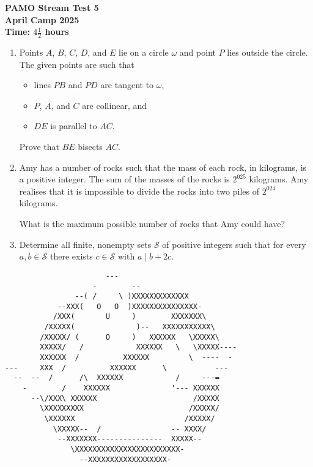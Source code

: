 \documentclass[12pt]{article}
\begin{document}
\thispagestyle{empty}

\begin{center}
  \bfseries
  \Large PAMO Stream Test 5
  \\ \bigskip
  \large April Camp 2025
  \\ \bigskip
  Time: $4\frac{1}{2}$ hours
\end{center}

\bigskip\bigskip
\begin{enumerate}[leftmargin=0pt,itemsep=\bigskipamount]

\item Points $A$, $B$, $C$, $D$, and $E$ lie on a circle $\omega$ and point $P$ lies outside the circle.
The given points are such that
\begin{itemize}
    \item lines $PB$ and $PD$ are tangent to $\omega$,
    \item $P$, $A$, and $C$ are collinear, and
    \item $DE$ is parallel to $AC$.
\end{itemize}
Prove that $BE$ bisects $AC$.

\item Amy has a number of rocks such that the mass of each rock, in kilograms, is a positive integer.
The sum of the masses of the rocks is $2^{025}$ kilograms.
Amy realises that it is impossible to divide the rocks into two piles of $2^{024}$ kilograms.

What is the maximum possible number of rocks that Amy could have?

\item Determine all finite, nonempty sets $\mathcal{S}$ of positive integers such that for every $a,b\in\mathcal{S}$ there exists $c\in\mathcal{S}$ with $a \mid b+ 2c$.

\end{enumerate}


\vfill
\centering
\scriptsize %
\begin{BVerbatim}
                       ---                                     
                    -        --                             
                --( /     \ )XXXXXXXXXXXXX                   
            --XXX(   O   O  )XXXXXXXXXXXXXXX-              
           /XXX(       U     )        XXXXXXX\               
         /XXXXX(              )--   XXXXXXXXXXX\             
        /XXXXX/ (      O     )   XXXXXX   \XXXXX\
        XXXXX/   /            XXXXXX   \   \XXXXX----        
        XXXXXX  /          XXXXXX         \  ----  -         
---     XXX  /          XXXXXX      \           ---        
  --  --  /      /\  XXXXXX            /     ---=         
    -        /    XXXXXX              '--- XXXXXX         
      --\/XXX\ XXXXXX                      /XXXXX         
        \XXXXXXXXX                        /XXXXX/
         \XXXXXX                         /XXXXX/         
           \XXXXX--  /                -- XXXX/       
            --XXXXXXX---------------  XXXXX--         
               \XXXXXXXXXXXXXXXXXXXXXXXX-            
                 --XXXXXXXXXXXXXXXXXX-
\end{BVerbatim}
\end{document}

